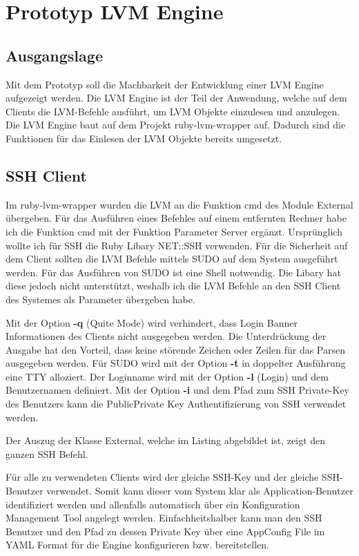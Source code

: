\chapter{Prototyp LVM Engine}
\label{cha:Prototyp}



\section{Ausgangslage}
Mit dem Prototyp soll die Machbarkeit der Entwicklung einer LVM Engine aufgezeigt werden.
Die LVM Engine ist der Teil der Anwendung, welche auf dem Clients die LVM-Befehle ausführt, um LVM Objekte einzulesen und anzulegen. Die LVM Engine baut auf dem Projekt ruby-lvm-wrapper auf. Dadurch sind die Funktionen für das Einlesen der LVM Objekte bereits umgesetzt.

\section{SSH Client}
Im ruby-lvm-wrapper wurden die LVM an die Funktion cmd des Module External übergeben. Für das Ausführen eines Befehles auf einem entfernten Rechner habe ich die Funktion cmd mit der Funktion Parameter Server ergänzt. Ursprünglich wollte ich für SSH die Ruby Libary NET::SSH verwenden. Für die Sicherheit auf dem Client sollten die LVM Befehle mittels SUDO auf dem System ausgeführt werden. Für das Ausführen von SUDO ist eine Shell notwendig. Die Libary hat diese jedoch nicht unterstützt, weshalb ich die LVM Befehle an den SSH Client des Systemes als Parameter übergeben habe. 

Mit der Option \textbf{-q}  (Quite Mode) wird verhindert, dass Login Banner Informationen des Clients nicht ausgegeben werden. Die Unterdrückung der Ausgabe hat den Vorteil, dass keine störende Zeichen oder Zeilen für das Parsen ausgegeben werden. Für SUDO wird mit der Option \textbf{-t} in doppelter Ausführung eine TTY alloziert. Der Loginname wird mit der Option \textbf{-l} (Login) und dem Benutzernamen definiert. Mit der Option \textbf{-i} und dem Pfad zum SSH Private-Key des Benutzers kann die PublicPrivate Key Authentifizierung von SSH verwendet werden.

Der Auszug der Klasse External, welche im Listing  abgebildet ist, zeigt den ganzen SSH Befehl.

Für alle zu verwendeten Clients wird der gleiche SSH-Key und der gleiche SSH-Benutzer verwendet. Somit kann dieser vom System klar als Application-Benutzer identifiziert werden und allenfalls automatisch über ein Konfiguration Management Tool angelegt werden. Einfachheitshalber kann man den SSH Benutzer und den Pfad zu dessen Private Key über eine AppConfig File im YAML Format für die Engine konfigurieren bzw. bereitstellen.

